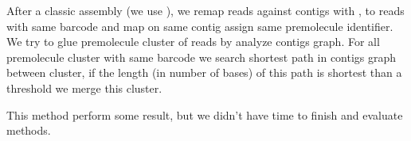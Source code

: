 \documentclass[main.tex]{subfiles}
\begin{document}
After a classic \DBG assembly (we use ), we remap reads against contigs with , to reads with same barcode and map on same contig  assign same premolecule identifier. We try to glue premolecule cluster of reads by analyze contigs graph. For all premolecule cluster with same barcode we search shortest path in contigs graph between cluster, if the length (in number of bases) of this path is shortest than a threshold we merge this cluster. 

This method perform some result, but we didn't have time to finish and evaluate methods.

\end{document}
